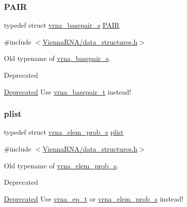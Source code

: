 \subsubsection{\texorpdfstring{P\+A\+IR}{PAIR}}
{\footnotesize\ttfamily typedef struct \hyperlink{group__data__structures_structvrna__basepair__s}{vrna\+\_\+basepair\+\_\+s} \hyperlink{group__data__structures_ga4381025ffbd692e54189b2c679c79c99}{P\+A\+IR}}



{\ttfamily \#include $<$\hyperlink{data__structures_8h}{Vienna\+R\+N\+A/data\+\_\+structures.\+h}$>$}



Old typename of \hyperlink{group__data__structures_structvrna__basepair__s}{vrna\+\_\+basepair\+\_\+s}. 

\begin{DoxyRefDesc}{Deprecated}
\item[\hyperlink{deprecated__deprecated000046}{Deprecated}]Use \hyperlink{group__data__structures_gac8c5669d3fb813cacf506489689305ce}{vrna\+\_\+basepair\+\_\+t} instead! \end{DoxyRefDesc}
\mbox{\label{group__data__structures_ga9608eed021ebfbdd7a901cfdc446c8e9}} 
\subsubsection{\texorpdfstring{plist}{plist}}
{\footnotesize\ttfamily typedef struct \hyperlink{group__struct__utils_structvrna__elem__prob__s}{vrna\+\_\+elem\+\_\+prob\+\_\+s} \hyperlink{group__data__structures_ga9608eed021ebfbdd7a901cfdc446c8e9}{plist}}



{\ttfamily \#include $<$\hyperlink{data__structures_8h}{Vienna\+R\+N\+A/data\+\_\+structures.\+h}$>$}



Old typename of \hyperlink{group__struct__utils_structvrna__elem__prob__s}{vrna\+\_\+elem\+\_\+prob\+\_\+s}. 

\begin{DoxyRefDesc}{Deprecated}
\item[\hyperlink{deprecated__deprecated000047}{Deprecated}]Use \hyperlink{group__struct__utils_gab9ac98ab55ded9fb90043b024b915aca}{vrna\+\_\+ep\+\_\+t} or \hyperlink{group__struct__utils_structvrna__elem__prob__s}{vrna\+\_\+elem\+\_\+prob\+\_\+s} instead! \end{DoxyRefDesc}
\mbox{\label{group__data__structures_ga8412f116a2eb07b59ade9e14ca7c5ef1}} 
